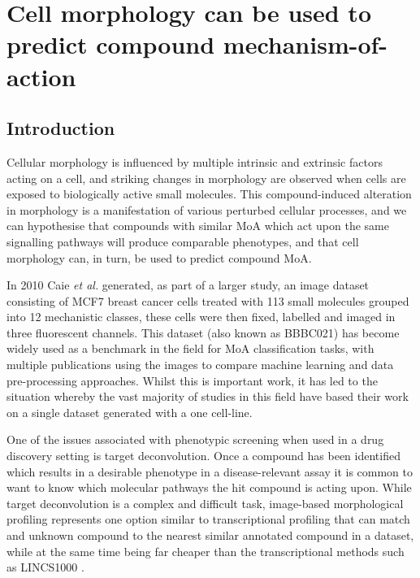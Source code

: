 \documentclass[a4paper,11pt,twoside,openright]{scrbook}
\begin{document}
\chapter{Cell morphology can be used to predict compound mechanism-of-action} \label{chapter:moa}

\section{Introduction}
Cellular morphology is influenced by multiple intrinsic and extrinsic factors acting on a cell, and striking changes in morphology are observed when cells are exposed to biologically active small molecules.
This compound-induced alteration in morphology is a manifestation of various perturbed cellular processes, and we can hypothesise that compounds with similar MoA which act upon the same signalling pathways will produce comparable phenotypes, and that cell morphology can, in turn, be used to predict compound MoA.

In 2010 Caie \textit{et al.} generated, as part of a larger study, an image dataset consisting of MCF7 breast cancer cells treated with 113 small molecules grouped into 12 mechanistic classes, these cells were then fixed, labelled and imaged in three fluorescent channels\cite{Caie2010}.
This dataset (also known as BBBC021) has become widely used as a benchmark in the field for MoA classification tasks, with multiple publications using the images to compare machine learning and data pre-processing approaches. \cite{Ljosa2013a,Singh2014a,Pawlowski2016,Ando2017}
Whilst this is important work, it has led to the situation whereby the vast majority of studies in this field have based their work on a single dataset generated with a one cell-line.

One of the issues associated with phenotypic screening when used in a drug discovery setting is target deconvolution.
Once a compound has been identified which results in a desirable phenotype in a disease-relevant assay it is common to want to know which molecular pathways the hit compound is acting upon.
While target deconvolution is a complex and difficult task, image-based morphological profiling represents one option similar to transcriptional profiling that can match and unknown compound to the nearest similar annotated compound in a dataset, while at the same time being far cheaper than the transcriptional methods such as LINCS1000 \cite{Duan2014}.
\end{document}
